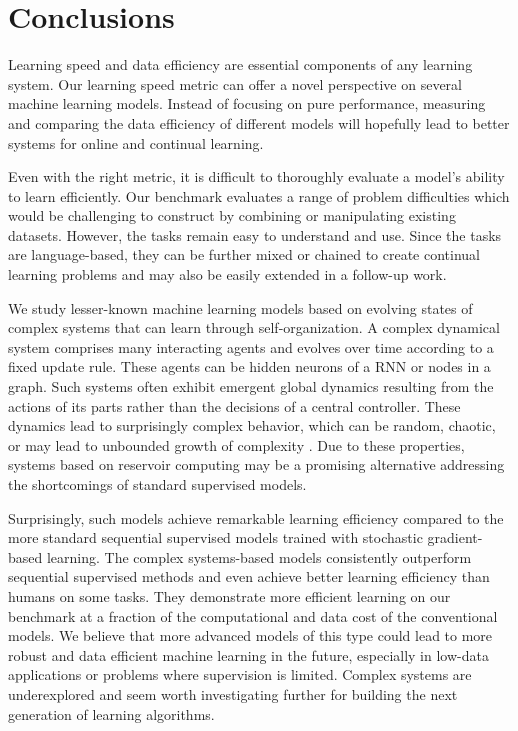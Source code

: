 \section{Conclusions}

Learning speed and data efficiency are essential components of any learning
system. Our learning speed metric can offer a novel perspective on several
machine learning models. Instead of focusing on pure performance, measuring and
comparing the data efficiency of different models will hopefully lead to better
systems for online and continual learning.


Even with the right metric, it is difficult to thoroughly evaluate a model's
ability to learn efficiently. Our benchmark evaluates a range of problem
difficulties which would be challenging to construct by combining or
manipulating existing datasets. However, the tasks remain easy to understand and
use. Since the tasks are language-based, they can be further mixed or chained to
create continual learning problems and may also be easily extended in a
follow-up work.

We study lesser-known machine learning models based on evolving states of
complex systems that can learn through self-organization. A complex dynamical
system comprises many interacting agents and evolves over time according to a
fixed update rule. These agents can be hidden neurons of a \ac{RNN} or nodes in
a graph. Such systems often exhibit emergent global dynamics resulting from the
actions of its parts rather than the decisions of a central controller. These
dynamics lead to surprisingly complex behavior, which can be random, chaotic, or
may lead to unbounded growth of complexity
\parencite{boccaraModelingComplexSystems2010}. Due to these
properties,
systems based on reservoir computing may be a promising alternative addressing
the shortcomings of standard supervised models.

Surprisingly, such models achieve remarkable learning efficiency compared to the
more standard sequential supervised models trained with stochastic
gradient-based learning. The complex systems-based models consistently
outperform sequential supervised methods and even achieve better learning
efficiency than humans on some tasks. They demonstrate more efficient learning
on our benchmark at a fraction of the computational and data cost of the
conventional models. We believe that more advanced models of this type could
lead to more robust and data efficient machine learning in the future,
especially in low-data applications or problems where supervision is limited.
Complex systems are underexplored and seem worth investigating further for
building the next generation of learning algorithms.
